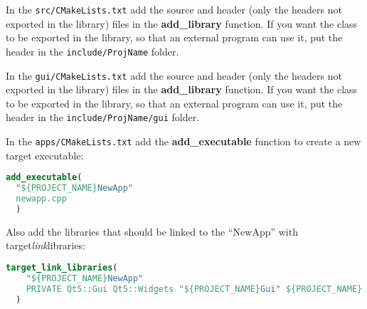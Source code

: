 
In the \texttt{src/CMakeLists.txt} add the source and header (only the
headers not exported in the library) files in the \textbf{add\_library}
function. If you want the class to be exported in the library, so that
an external program can use it, put the header in the
\texttt{include/ProjName} folder.



In the \texttt{gui/CMakeLists.txt} add the source and header (only the
headers not exported in the library) files in the \textbf{add\_library}
function. If you want the class to be exported in the library, so that
an external program can use it, put the header in the
\texttt{include/ProjName/gui} folder.



In the \texttt{apps/CMakeLists.txt} add the \textbf{add\_executable}
function to create a new target executable:

\begin{lstlisting}[language=cmake, gobble=2]
  add_executable(
  "${PROJECT_NAME}NewApp"
  newapp.cpp
  )
\end{lstlisting}

Also add the libraries that should be linked to the ``NewApp'' with
target\emph{link}libraries:

\begin{lstlisting}[language=cmake, gobble=2]
  target_link_libraries(
    "${PROJECT_NAME}NewApp"
    PRIVATE Qt5::Gui Qt5::Widgets "${PROJECT_NAME}Gui" ${PROJECT_NAME} ${SUBMODULES_NAME}
  )
\end{lstlisting}
